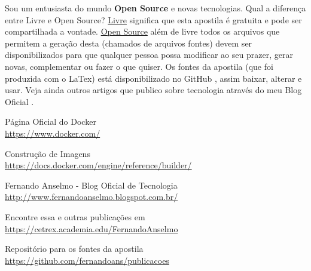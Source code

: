 \documentclass[a4paper,11pt]{article}
\begin{document}
Sou um entusiasta do mundo \textbf{Open Source} e novas tecnologias. Qual a diferença entre Livre e Open Source? \underline{Livre} significa que esta apostila é gratuita e pode ser compartilhada a vontade. \underline{Open Source} além de livre todos os arquivos que permitem a geração desta (chamados de arquivos fontes) devem ser disponibilizados para que qualquer pessoa possa modificar ao seu prazer, gerar novas, complementar ou fazer o que quiser. Os fontes da apostila (que foi produzida com o LaTex) está disponibilizado no GitHub \cite{github}, assim baixar, alterar e usar. Veja ainda outros artigos que publico sobre tecnologia através do meu Blog Oficial \cite{fernandoanselmo}.

\begin{thebibliography}{5}
  Página Oficial do Docker \\
  \url{https://www.docker.com/}
  
  Construção de Imagens \\
  \url{https://docs.docker.com/engine/reference/builder/}

  Fernando Anselmo - Blog Oficial de Tecnologia \\
  \url{http://www.fernandoanselmo.blogspot.com.br/}

  Encontre essa e outras publicações em \\
  \url{https://cetrex.academia.edu/FernandoAnselmo}

  Repositório para os fontes da apostila \\
  \url{https://github.com/fernandoans/publicacoes}
\end{thebibliography}
  
\end{document}
